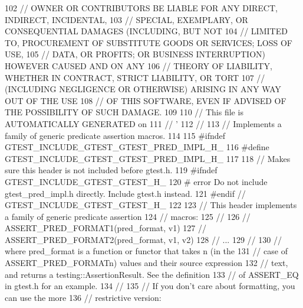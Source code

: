 \begin{DoxyCode}
{{{102 \textcolor{stringliteral}{// OWNER OR CONTRIBUTORS BE LIABLE FOR ANY DIRECT, INDIRECT, INCIDENTAL,}
103 \textcolor{stringliteral}{// SPECIAL, EXEMPLARY, OR CONSEQUENTIAL DAMAGES (INCLUDING, BUT NOT}
104 \textcolor{stringliteral}{// LIMITED TO, PROCUREMENT OF SUBSTITUTE GOODS OR SERVICES; LOSS OF USE,}
105 \textcolor{stringliteral}{// DATA, OR PROFITS; OR BUSINESS INTERRUPTION) HOWEVER CAUSED AND ON ANY}
106 \textcolor{stringliteral}{// THEORY OF LIABILITY, WHETHER IN CONTRACT, STRICT LIABILITY, OR TORT}
107 \textcolor{stringliteral}{// (INCLUDING NEGLIGENCE OR OTHERWISE) ARISING IN ANY WAY OUT OF THE USE}
108 \textcolor{stringliteral}{// OF THIS SOFTWARE, EVEN IF ADVISED OF THE POSSIBILITY OF SUCH DAMAGE.}
109 \textcolor{stringliteral}{}
110 \textcolor{stringliteral}{// This file is AUTOMATICALLY GENERATED on %
111 \textcolor{stringliteral}{// '%
112 \textcolor{stringliteral}{//}
113 \textcolor{stringliteral}{// Implements a family of generic predicate assertion macros.}
114 \textcolor{stringliteral}{}
115 \textcolor{stringliteral}{#ifndef GTEST\_INCLUDE\_GTEST\_GTEST\_PRED\_IMPL\_H\_}
116 \textcolor{stringliteral}{#define GTEST\_INCLUDE\_GTEST\_GTEST\_PRED\_IMPL\_H\_}
117 \textcolor{stringliteral}{}
118 \textcolor{stringliteral}{// Makes sure this header is not included before gtest.h.}
119 \textcolor{stringliteral}{#ifndef GTEST\_INCLUDE\_GTEST\_GTEST\_H\_}
120 \textcolor{stringliteral}{# error Do not include gtest\_pred\_impl.h directly.  Include gtest.h instead.}
121 \textcolor{stringliteral}{#endif  // GTEST\_INCLUDE\_GTEST\_GTEST\_H\_}
122 \textcolor{stringliteral}{}
123 \textcolor{stringliteral}{// This header implements a family of generic predicate assertion}
124 \textcolor{stringliteral}{// macros:}
125 \textcolor{stringliteral}{//}
126 \textcolor{stringliteral}{//   ASSERT\_PRED\_FORMAT1(pred\_format, v1)}
127 \textcolor{stringliteral}{//   ASSERT\_PRED\_FORMAT2(pred\_format, v1, v2)}
128 \textcolor{stringliteral}{//   ...}
129 \textcolor{stringliteral}{//}
130 \textcolor{stringliteral}{// where pred\_format is a function or functor that takes n (in the}
131 \textcolor{stringliteral}{// case of ASSERT\_PRED\_FORMATn) values and their source expression}
132 \textcolor{stringliteral}{// text, and returns a testing::AssertionResult.  See the definition}
133 \textcolor{stringliteral}{// of ASSERT\_EQ in gtest.h for an example.}
134 \textcolor{stringliteral}{//}
135 \textcolor{stringliteral}{// If you don't care about formatting, you can use the more}
136 \textcolor{stringliteral}{// restrictive version:}
}}}}}
\end{DoxyCode}
